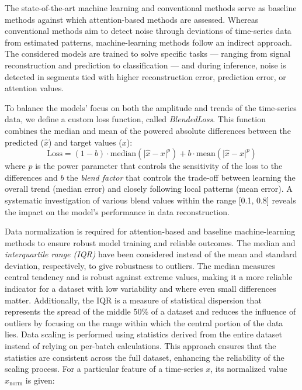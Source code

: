 \documentclass[conference]{IEEEtran}
\begin{document}
The state-of-the-art machine learning and conventional methods serve as baseline methods against which attention-based methods are assessed.
Whereas conventional methods aim to detect noise through deviations of time-series data from estimated patterns, machine-learning methods follow an indirect approach. The considered models are trained to solve specific tasks — ranging from signal reconstruction and prediction to classification — and during inference, noise is detected in segments tied with higher reconstruction error, prediction error, or attention values.

To balance the models’ focus on both the amplitude and trends of the time-series data, we define a custom loss function, called \emph{BlendedLoss}. This function combines the median and mean of the powered absolute differences between the predicted ($\hat{x}$) and target values ($x$):
%
\begin{equation}
\text{Loss} =
  (1 - b)\cdot\mathrm{median}(\lvert \hat{x} - x \rvert^p) +
  b\cdot\mathrm{mean}(\lvert \hat{x} - x \rvert^p)
\label{eq:blended_loss}
\end{equation}
%
where $p$ is the power parameter that controls the sensitivity of the loss to the differences and $b$ the \emph{blend factor} that controls the trade-off between learning the overall trend (median error) and closely following local patterns (mean error). A systematic investigation of various blend values within the range [0.1, 0.8] reveals the impact on the model's performance in data reconstruction.

Data normalization is required for attention-based and baseline machine-learning methods to ensure robust model training and reliable outcomes. The median and
\emph{interquartile range (IQR)} have been considered instead of the mean and
standard deviation, respectively, to give robustness to outliers.
The median measures central tendency and is robust against extreme values, making it a more reliable indicator for a dataset with low variability and where even small differences matter. Additionally, the IQR is a measure of statistical dispersion that represents the spread of the middle 50\% of a dataset and reduces the influence of outliers by focusing on the range within which the central portion of the data lies. Data scaling is performed using statistics derived from the entire dataset instead of relying on per-batch calculations. This approach ensures that the statistics are consistent across the full dataset, enhancing the reliability of the scaling process. For a particular feature of a time-series $x$, its normalized value $x_{\text{norm}}$ is given:
\end{document}
